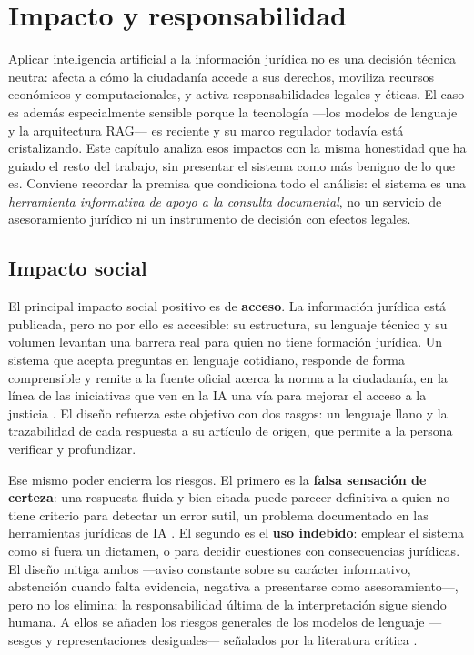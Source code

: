 \chapter{Impacto y responsabilidad}
\label{chap:impacto}

Aplicar inteligencia artificial a la información jurídica no es una decisión técnica neutra: afecta a cómo la ciudadanía accede a sus derechos, moviliza recursos económicos y computacionales, y activa responsabilidades legales y éticas. El caso es además especialmente sensible porque la tecnología —los modelos de lenguaje y la arquitectura RAG— es reciente y su marco regulador todavía está cristalizando. Este capítulo analiza esos impactos con la misma honestidad que ha guiado el resto del trabajo, sin presentar el sistema como más benigno de lo que es. Conviene recordar la premisa que condiciona todo el análisis: el sistema es una \emph{herramienta informativa de apoyo a la consulta documental}, no un servicio de asesoramiento jurídico ni un instrumento de decisión con efectos legales.

\section{Impacto social}
\label{sec:impacto-social}

El principal impacto social positivo es de \textbf{acceso}. La información jurídica está publicada, pero no por ello es accesible: su estructura, su lenguaje técnico y su volumen levantan una barrera real para quien no tiene formación jurídica. Un sistema que acepta preguntas en lenguaje cotidiano, responde de forma comprensible y remite a la fuente oficial acerca la norma a la ciudadanía, en la línea de las iniciativas que ven en la IA una vía para mejorar el acceso a la justicia \cite{oecdAccessJusticeAI}. El diseño refuerza este objetivo con dos rasgos: un lenguaje llano y la trazabilidad de cada respuesta a su artículo de origen, que permite a la persona verificar y profundizar.

Ese mismo poder encierra los riesgos. El primero es la \textbf{falsa sensación de certeza}: una respuesta fluida y bien citada puede parecer definitiva a quien no tiene criterio para detectar un error sutil, un problema documentado en las herramientas jurídicas de IA \cite{magesh2025hallucinationfree}. El segundo es el \textbf{uso indebido}: emplear el sistema como si fuera un dictamen, o para decidir cuestiones con consecuencias jurídicas. El diseño mitiga ambos —aviso constante sobre su carácter informativo, abstención cuando falta evidencia, negativa a presentarse como asesoramiento—, pero no los elimina; la responsabilidad última de la interpretación sigue siendo humana. A ellos se añaden los riesgos generales de los modelos de lenguaje —sesgos y representaciones desiguales— señalados por la literatura crítica \cite{bender2021stochastic}.

